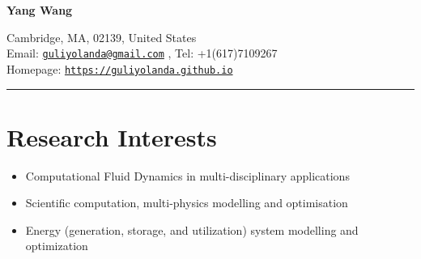 \documentclass[letterpaper]{article}
\def\name{Yang Wang}
\begin{document}

\centerline{\LARGE \bf \name}


\begin{minipage}{\linewidth}
\begin{center}
Cambridge, MA, 02139, United States\\
Email: \href{mailto:guliyolanda@gmail.com}{\tt guliyolanda@gmail.com} , Tel: +1(617)7109267 \\
Homepage:  \href{https://guliyolanda.github.io}{\tt https://guliyolanda.github.io} \\
\end{center}
\end{minipage}

\vspace{0pt}
\rule{\textwidth}{1pt}

\vspace{-12pt}
\section*{Research Interests}
\vspace{-10pt}
\begin{itemize}
\item Computational Fluid Dynamics in multi-disciplinary applications
\item Scientific computation, multi-physics modelling and optimisation
\item Energy (generation, storage, and utilization) system modelling and optimization

\end{itemize}

\vspace{-12pt}
\end{document}
